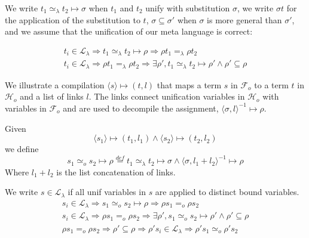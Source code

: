 \documentclass[sigconf,natbib=false]{acmart}
\newcommand{\EqualRel}{\ensuremath{=}}
\newcommand{\UnifRel}{\ensuremath{\simeq}}
\newcommand{\Uo}{\ensuremath{\UnifRel_o}\xspace}
\newcommand{\Eo}{\ensuremath{\EqualRel_o}\xspace}
\newcommand{\Ue}{\ensuremath{\UnifRel_\lambda}\xspace}
\newcommand{\Ee}{\ensuremath{\EqualRel_\lambda}\xspace}
\newcommand{\llambda}{\ensuremath{\mathcal{L}_\lambda}\xspace}
\newcommand{\Fo}{\ensuremath{\mathcal{F}_{\!o}\xspace}} %
\newcommand{\Ho}{\ensuremath{\mathcal{H}_o}\xspace}
\begin{document}
\newcommand{\unifcorrect}[3]{
    #3_i \in \llambda \Rightarrow
      #3_1 #2 #3_2 \mapsto \rho
        \Rightarrow 
          \rho #3_1 #1 \rho #3_2  %
}

\newcommand{\unifcomplete}[3]{
    #3_i \in \llambda \Rightarrow
        \rho #3_1 #1 \rho #3_2  %
          \Rightarrow \exists \rho', #3_1 #2 #3_2 \mapsto \rho' \land \rho' \subseteq \rho 
}

We write $t_1 \Ue t_2 \mapsto \sigma$ when $t_1$ and $t_2$ unify with substitution
$\sigma$, we write $\sigma t$ for the application of the substitution to
$t$, $\sigma \subseteq \sigma'$ when $\sigma$ is more general than $\sigma'$,
and we assume that the unification of our meta language is correct:

%
\begin{gather}
  \unifcorrect{\Ee}{\Ue}{t} \label{prop:correct-ml}\\
  \unifcomplete{\Ee}{\Ue}{t}
\end{gather}

\newcommand{\C}[3]{\ensuremath{\langle #1 \rangle}\mapsto(#2,#3)}
\newcommand{\D}[3]{\ensuremath{\langle #1,#2 \rangle^{-1}\mapsto #3}}

We illustrate a compilation $\C{s}{t}{l}$ that
maps a term $s$ in \Fo{} to a term $t$ in \Ho and a list of links $l$.
The links connect unification variables in \Ho with variables
in \Fo{} and are used to decompile the assignment,
$\D{\sigma}{l}{\rho}$.

Given 
$$
\C{s_1}{t_1}{l_1} \land \C{s_2}{t_2}{l_2}
$$
we define
$$
s_1 \Uo s_2 \mapsto \rho \stackrel{def}{=}
    t_1 \Ue t_2 \mapsto \sigma \land
    \D{\sigma}{l_1 + l_2}{\rho}
$$
Where $l_1 + l_2$ is the list concatenation of links.

We write $s \in \mathcal{L}_\lambda$ if all unif variables in
$s$ are applied to distinct bound variables.
%
\begin{gather}
\unifcorrect{\Eo}{\Uo}{s}\label{prop:correct}\\
\unifcomplete{\Eo}{\Uo}{s}\label{prop:complete}\\
  \rho s_1 \Eo \rho s_2 \Rightarrow
  \rho' \subseteq \rho \Rightarrow
  \rho's_i \in \mathcal{L}_\lambda \Rightarrow
  \rho' s_1 \Uo \rho' s_2 \label{prop:simulation}
\end{gather}
\end{document}
